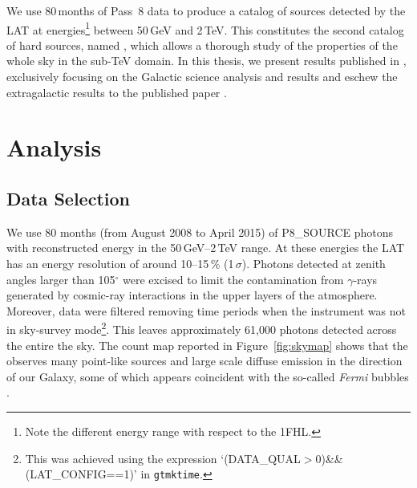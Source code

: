 We use 80\,months of Pass~8 data to produce a catalog of sources detected by the LAT at energies\footnote{Note the different energy range with respect to the 1FHL.} between 50\,GeV and 2\,TeV. This constitutes the second catalog of hard \lat{} sources, named \twofhl{}, which allows a thorough study of the properties of the whole sky in the sub-TeV domain. In this thesis, we present results published in \cite{2FHL}, exclusively focusing on the Galactic science analysis and results and eschew the extragalactic results to the published \twofhl{} paper .


%
%
\section{Analysis}
\label{sec:analysis}


%
%

\subsection{\label{sec:data_sel}Data Selection}


We use 80 months (from August 2008 to April 2015) of P8\_SOURCE 
photons with reconstructed energy in the 50\,GeV--2\,TeV range.
At these energies the LAT has an energy resolution of around 10--15\,\% (1\,$\sigma$).
Photons detected at zenith angles larger than 105$^{\circ}$ were excised
to limit the contamination from $\gamma$-rays generated by cosmic-ray
interactions in the upper layers of the atmosphere. Moreover, data were filtered
removing time periods when the instrument was not in sky-survey mode\footnote{This
    was achieved using the expression `(DATA\_QUAL$>$0)\&\&(LAT\_CONFIG==1)' in {\tt gtmktime}.}.
This leaves
approximately 61,000 photons detected across the entire  the sky. The count map
reported in Figure~\ref{fig:skymap} shows that the \lat{} observes
many point-like sources and
large scale diffuse emission in the direction of our Galaxy, some of which appears
coincident  with the so-called {\it Fermi} bubbles \citep{su10,lat_bubbles}.



